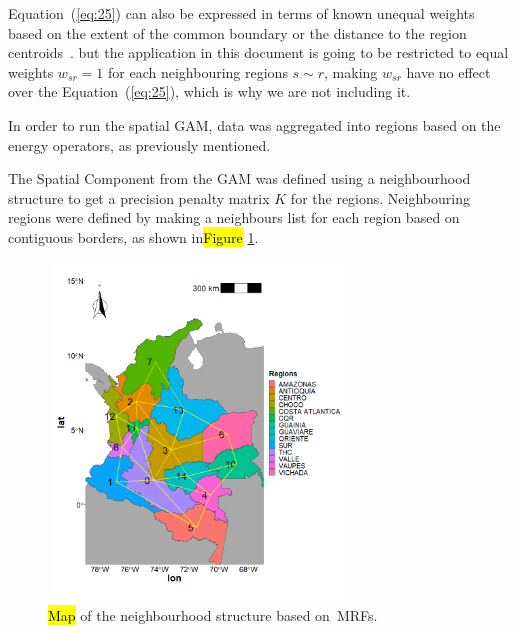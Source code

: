 \documentclass[energies,article,accept,pdftex,moreauthors]{Definitions/mdpi}
\begin{document}
    Equation~(\ref{eq:25}) can also be expressed in terms of known unequal weights based on the extent of the common boundary or the distance to the region centroids~\citep{Fahrmeir2011BayesianData,Wang2014SpatialComputations}. but the application in this document is going to be restricted to equal weights $w_{sr}=1$ for each neighbouring regions $s \sim r$, making $w_{sr}$ have no effect over the Equation~(\ref{eq:25}), which is why we are not including it.
    
    In order to run the spatial GAM, data was aggregated into regions based on the energy operators, as previously mentioned. 
    
    The Spatial Component from the GAM was defined using a neighbourhood structure to get a precision penalty matrix $K$ for the regions. Neighbouring regions were defined by making a neighbours list for each region based on contiguous borders, as shown in\hl{Figure} \ref{fig:8}. %
                \begin{figure}[H]

\hspace{-1em}
   \centering
   \includegraphics[height=9cm, width=8cm]{figs/Map_Neighborhood_Structure.png}
   \centering
	\caption{\hl{Map} %
	of the neighbourhood structure based on~MRFs.\label{fig:8}}
    \end{figure}
    
\end{document}
